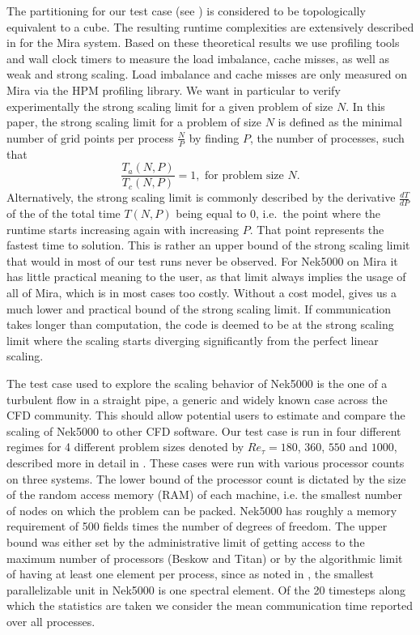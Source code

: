 \documentclass{sig-alternate}
\begin{document}
The partitioning for our test case (see ) is considered to be
topologically equivalent to a cube. The resulting runtime complexities are
extensively described in \cite{fischer:scaling} for the Mira system. Based on
these theoretical results we use profiling tools and wall clock timers to
measure the load imbalance,
cache misses, as well as weak and strong scaling. Load imbalance and cache
misses are only measured on Mira via the HPM profiling library. 
We want in particular to verify
experimentally the strong scaling limit for a given problem of size $N$. 
In this paper, the strong scaling limit for a problem of size $N$ is defined
as the minimal number of grid points per process $\frac{N}{P}$ by finding $P$,
the number of processes, such that
\begin{equation}
  \dfrac{T_a(N,P)}{T_c(N,P)}=1,\mbox{ for problem size }N.
  \label{eq:strong}
\end{equation} 
\noindent Alternatively, the strong scaling limit is commonly described by the
derivative $\frac{dT}{dP}$ of the
of the total time $T(N,P)$ being equal to $0$, i.e.\ the point where the runtime
starts increasing again with increasing $P$. That point represents the fastest
time to solution. This is rather an upper bound of the strong scaling
limit that would in most of our test runs never be observed. For Nek5000 on Mira it has
little practical meaning to the user, as that limit always implies the usage
of all of Mira, which is in most cases too costly. Without a cost model,
  gives us a much lower and practical bound of the strong
scaling limit. If communication takes longer than
computation, the code is deemed to be at the strong scaling limit where the
scaling starts diverging significantly from the perfect linear scaling. 

The test case used to explore the scaling behavior of Nek5000 is the one of a turbulent 
flow in a straight pipe, a generic and widely known case across the CFD community.
This should allow potential users to estimate and compare the scaling of Nek5000 to other CFD software.
Our test case is run in four different regimes for 4 different problem sizes denoted by
$Re_{\tau} = 180$, $360$, $550$ and $1000$, described more in
detail in . These cases were run with various processor counts 
on three systems. The lower bound of the processor count is dictated by the size 
of the random access memory (RAM) of each machine, i.e. the smallest number of 
nodes on which the problem can be packed. Nek5000 has roughly a memory requirement of 500 fields 
times the number of degrees of freedom. The upper bound was either set by the
administrative limit of getting access to the maximum number of processors
(Beskow and Titan) or by the algorithmic limit of having at least one element 
per process, since as noted in , the smallest parallelizable 
unit in Nek5000 is one spectral element. Of the 20 timesteps along which the
statistics are taken we consider the mean communication time reported over all
processes. 
\end{document}
